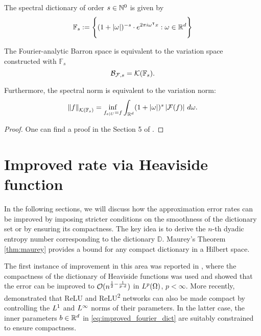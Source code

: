 \begin{definition}
    The spectral dictionary of order $s \in \mathbb{N}^0$ is given by
    \begin{equation}
        \mathbb{F}_s := \Bigg\{ 
            (1 + \left| \omega \right|)^{-s} \cdot e^{2\pi i\omega{}^{\intercal} x}: 
            \omega \in \mathbb{R}^d
        \Bigg\}
    \end{equation}
\end{definition}

\begin{theorem}
The Fourier-analytic Barron space is equivalent to the variation space
constructed with $\mathbb{F}_s$
\begin{equation}
    \mathcal{B}_{\mathcal{F}, s} = \mathcal{K}({\mathbb{F}_s}).
\end{equation}

Furthermore, the spectral norm is equivalent to the variation norm:
\begin{equation}
    \left\| {f} \right\|_{\mathcal{K}({\mathbb{F}_s})} =
    \inf_{f_{e\mid U} = f} \int_{\mathbb{R}^d} 
    (1+\left| \omega \right|)^s \left| \mathcal{F}(f) \right| \,d\omega.
\end{equation}
\end{theorem}

\begin{proof}
    One can find a proof in the Section 5 of
    \cite{siegelCharacterizationVariationSpaces2022}.
\end{proof}

\section{Improved rate via Heaviside function}
\label{sec:improved_heaviside}

In the following sections, we will discuss how the approximation error rates can
be improved by imposing stricter conditions on the smoothness of the dictionary
set or by ensuring its compactness. The key idea is to derive the $n$-th dyadic
entropy number corresponding to the dictionary $\mathbb{D}$. Maurey’s Theorem
\ref{thm:maurey} provides a bound for any compact dictionary in a Hilbert space.

The first instance of improvement in this area was reported in
\cite{makovozRandomApproximantsNeural1996}, where the compactness of the
dictionary of Heaviside functions was used and showed that the error can be
improved to $\mathcal{O}(n^{\frac{1}{2} - \frac{1}{p \cdot d}})$ in $L^{p}(\Omega)$,
$p < \infty$. More recently, \cite{klusowskiApproximationCombinationsReLU2018a}
demonstrated that ReLU and ReLU\textsuperscript{2} networks can also be made
compact by controlling the $L^{1}$ and $L^{\infty}$ norms of their parameters.
In the latter case, the inner parameters $b\in\mathbb{R}^d$ in
\eqref{eq:improved_fourier_dict} are suitably constrained to ensure compactness.

